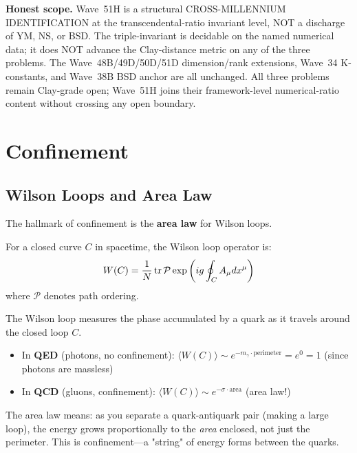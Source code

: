 \begin{remark}
\textbf{Honest scope.} Wave~51H is a structural CROSS-MILLENNIUM IDENTIFICATION at the transcendental-ratio invariant level, NOT a discharge of YM, NS, or BSD. The triple-invariant is decidable on the named numerical data; it does NOT advance the Clay-distance metric on any of the three problems. The Wave~48B/49D/50D/51D dimension/rank extensions, Wave~34 K-constants, and Wave~38B BSD anchor are all unchanged. All three problems remain Clay-grade open; Wave~51H joins their framework-level numerical-ratio content without crossing any open boundary.
\end{remark}

\section{Confinement}

\subsection{Wilson Loops and Area Law}

The hallmark of confinement is the \textbf{area law} for Wilson loops.

\begin{defn}\label{def:wilson-loop}
For a closed curve $C$ in spacetime, the Wilson loop operator is:
\begin{equation}
W(C) = \frac{1}{N}\tr \mathcal{P} \exp\left(ig \oint_C A_\mu dx^\mu\right)
\end{equation}
where $\mathcal{P}$ denotes path ordering.
\end{defn}

\begin{intuitive}
The Wilson loop measures the phase accumulated by a quark as it travels around the closed loop $C$.

\begin{itemize}
\item In \textbf{QED} (photons, no confinement): $\langle W(C) \rangle \sim e^{-m_\gamma \cdot \text{perimeter}} = e^0 = 1$ (since photons are massless)

\item In \textbf{QCD} (gluons, confinement): $\langle W(C) \rangle \sim e^{-\sigma \cdot \text{area}}$ (area law!)
\end{itemize}

The area law means: as you separate a quark-antiquark pair (making a large loop), the energy grows proportionally to the \textit{area} enclosed, not just the perimeter. This is confinement—a "string" of energy forms between the quarks.
\end{intuitive}

